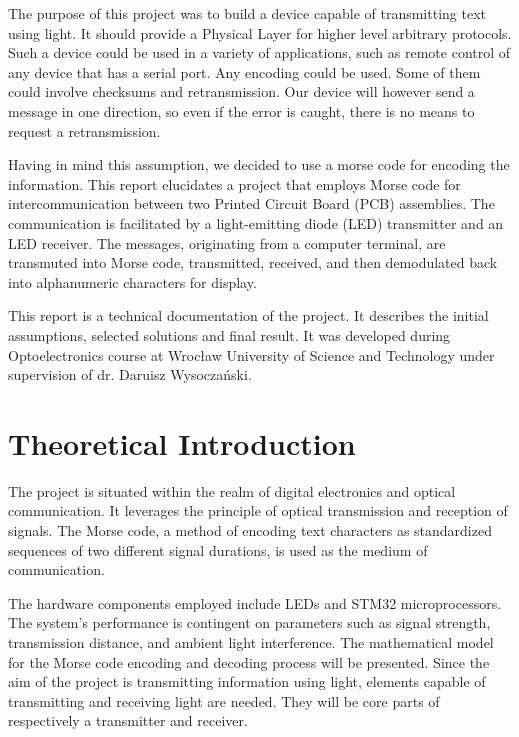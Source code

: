 \documentclass[12pt]{article}
\begin{document}
  The purpose of this project was to build a device capable of transmitting text using light. It should provide a Physical Layer for higher level arbitrary protocols.
  Such a device could be used in a variety of applications, such as remote control of any device that has a serial port.
  Any encoding could be used. Some of them could involve checksums and retransmission. Our device will however send a message in one direction, so even if the error is caught,
  there is no means to request a retransmission. 

  Having in mind this assumption, we decided to use a morse code for encoding the information.
  This report elucidates a project that employs Morse code for intercommunication between two Printed Circuit Board (PCB) assemblies. The communication is facilitated by a light-emitting 
  diode (LED) transmitter and an LED receiver. The messages, originating from a computer terminal, are transmuted into Morse code, transmitted, received, and then demodulated back into alphanumeric characters for display.

  This report is a technical documentation of the project. It describes the initial assumptions, selected solutions and final result.
  It was developed during Optoelectronics course at Wrocław University of Science and Technology under supervision of dr. Daruisz Wysoczański.

	
	\section{Theoretical Introduction}
 The project is situated within the realm of digital electronics and optical communication. It leverages the principle of optical transmission and reception of signals. The Morse code, a method of encoding text characters as standardized 
  sequences of two different signal durations, is used as the medium of communication. 

  The hardware components employed include LEDs and STM32 microprocessors. The system's performance is contingent on parameters such as signal strength, 
  transmission distance, and ambient light interference. The mathematical model for the Morse code encoding and decoding process will be presented.
  Since the aim of the project is transmitting information using light, elements capable of transmitting and receiving light are needed.
  They will be core parts of respectively a transmitter and receiver.
\end{document}
